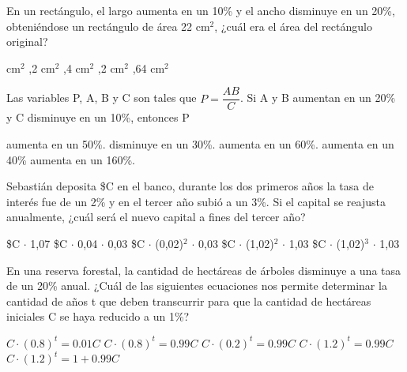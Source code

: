 \documentclass[pagina vacia]{srs}
\begin{document}
\begin{preguntas}[after-item-skip=2cm]
\pregunta En un rectángulo, el largo aumenta en un 10\% y el ancho disminuye en un 20\%, obteniéndose un rectángulo de área 22 cm\(^2\), ¿cuál era el área del rectángulo original?
\begin{vertical}
 cm\(^2\)
,2 cm\(^2\)
,4 cm\(^2\)
,2 cm\(^2\)
,64 cm\(^2\)
\end{vertical}

\pregunta Las variables P, A, B y C son tales que \( P = \dfrac{AB}{C} \). Si A y B aumentan en un 20\% y C disminuye en un 10\%, entonces P
\begin{vertical}
\alternativa aumenta en un 50\%.
\alternativa disminuye en un 30\%.
\alternativa aumenta en un 60\%.
\alternativa aumenta en un 40\%
\alternativa aumenta en un 160\%.
\end{vertical}

\pregunta Sebastián deposita \$C en el banco, durante los dos primeros años la tasa de interés fue de un 2\% y en el tercer año subió a un 3\%. Si el capital se reajusta anualmente, ¿cuál será el nuevo capital a fines del tercer año?
\begin{vertical}
\alternativa \$C \(\cdot\) 1,07
\alternativa \$C \(\cdot\) 0,04 \(\cdot\) 0,03
\alternativa \$C \(\cdot\) (0,02)\(^2\) \(\cdot\) 0,03
\alternativa \$C \(\cdot\) (1,02)\(^2\) \(\cdot\) 1,03
\alternativa \$C \(\cdot\) (1,02)\(^3\) \(\cdot\) 1,03
\end{vertical}

\pregunta En una reserva forestal, la cantidad de hectáreas de árboles disminuye a una tasa de un 20\% anual. ¿Cuál de las siguientes ecuaciones nos permite determinar la cantidad de años t que deben transcurrir para que la cantidad de hectáreas iniciales C se haya reducido a un 1\%?
\begin{vertical}
\alternativa \( C \cdot (0.8)^t = 0.01 C \)
\alternativa \( C \cdot (0.8)^t = 0.99 C \)
\alternativa \( C \cdot (0.2)^t = 0.99 C \)
\alternativa \( C \cdot (1.2)^t = 0.99 C \)
\alternativa \( C \cdot (1.2)^t = 1+0.99 C \)
\end{vertical}

\end{preguntas}
\end{document}
